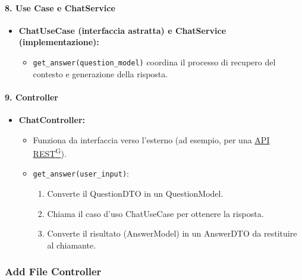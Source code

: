     \paragraph{8. Use Case e ChatService}
    \begin{itemize}
        \item \textbf{ChatUseCase (interfaccia astratta) e ChatService (implementazione):}
        \begin{itemize}
            \item \texttt{get\_answer(question\_model)} coordina il processo di recupero del contesto e generazione della risposta.
        \end{itemize}
    \end{itemize}

    \paragraph{9. Controller}
    \begin{itemize}
        \item \textbf{ChatController:}
        \begin{itemize}
            \item Funziona da interfaccia verso l’esterno (ad esempio, per una \href{https://code7crusaders.github.io/docs/PB/documentazione_interna/glossario.html#api-rest-representational-state-transfer}{API REST\textsuperscript{G}}).
            \item \texttt{get\_answer(user\_input)}:
            \begin{enumerate}
                \item Converte il QuestionDTO in un QuestionModel.
                \item Chiama il caso d’uso ChatUseCase per ottenere la risposta.
                \item Converte il risultato (AnswerModel) in un AnswerDTO da restituire al chiamante.
            \end{enumerate}
        \end{itemize}
    \end{itemize}

    \subsubsection{Add File Controller}

